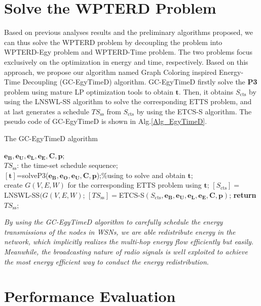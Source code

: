 \documentclass[journal,10pt]{IEEEtran}
\begin{document}
\section{Solve the WPTERD Problem}
\label{sec_algcombin}
Based on previous analyses results and the preliminary algorithms proposed, we can thus solve the WPTERD problem by decoupling the problem into WPTERD-Egy problem and WPTERD-Time problem. The two problems focus exclusively on the optimization in energy and time, respectively. Based on this approach, we propose our algorithm named Graph Coloring inspired Energy-Time Decoupling (GC-EgyTimeD) algorithm. GC-EgyTimeD firstly solve the \textbf{P3} problem using mature LP optimization tools to obtain $\mathbf{t}$. Then, it obtains $S_\text{cts}$ by using the LNSWL-SS algorithm to solve the corresponding ETTS problem, and at last generates a schedule $TS_\text{ss}$ from $S_\text{cts}$ by using the ETCS-S algorithm. The pseudo code of GC-EgyTimeD is shown in Alg.\ref{Alg_EgyTimeD}.

\begin{algorithm}[!htb]
\caption{The GC-EgyTimeD algorithm}
\begin{algorithmic}[1]\label{Alg_EgyTimeD}
    \REQUIRE $\mathbf{e_B}, \mathbf{e_U}, \mathbf{e_L}, \mathbf{e_E}, \mathbf{C}, \mathbf{p}$;\\
    \ENSURE $TS_\text{ss}$: the time-set schedule sequence;\\
    \STATE $[\mathbf{t}]${=}solveP3($\mathbf{e_B}, \mathbf{e_O},\mathbf{e_U},\mathbf{C}, \mathbf{p}$);\%using  to solve and obtain $\mathbf{t}$;\\
    \STATE create $G(V,E,W)$ for the corresponding ETTS problem using $\mathbf{t}$;
    \STATE $[S_\text{cts}]{=}$LNSWL-SS$(G(V,E,W)$;
    \STATE $[TS_\text{ss}]{=}$ETCS-S$(S_\text{cts},\mathbf{e_B}, \mathbf{e_U}, \mathbf{e_L}, \mathbf{e_E}, \mathbf{C}, \mathbf{p})$;
    \STATE \textbf{return} $TS_\text{ss}$;
\end{algorithmic}
\end{algorithm}

\textit{By using the GC-EgyTimeD algorithm to carefully schedule the energy transmissions of the nodes in WSNs, we are able redistribute energy in the network, which implicitly realizes the multi-hop energy flow efficiently but easily. Meanwhile, the broadcasting nature of radio signals is well exploited to achieve the most energy efficient way to conduct the energy redistribution}.

\section{Performance Evaluation}
\label{sec_sim}
\end{document}
